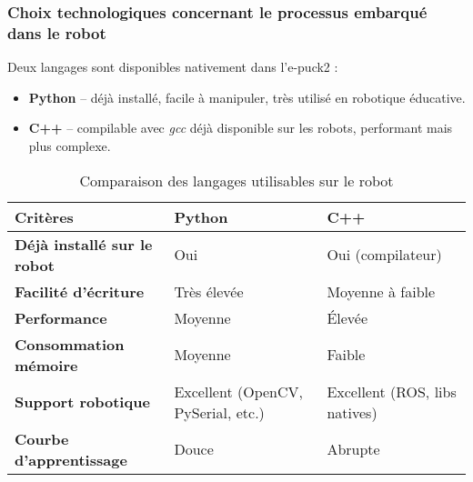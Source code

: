 \subsubsection{Choix technologiques concernant le processus embarqué dans le robot} \label{sec:choix_robot}
Deux langages sont disponibles nativement dans l'e-puck2 :
\begin{itemize}
    \item \textbf{Python} – déjà installé, facile à manipuler, très utilisé en robotique éducative.
    \item \textbf{C++} – compilable avec \textit{gcc} déjà disponible sur les robots, performant mais plus complexe.
\end{itemize}

\begin{longtable}[h!]{|p{}|p{}|p{}|}
\caption{\label{tab:comparison_robot_languages} Comparaison des langages utilisables sur le robot} \\

\hline
\textbf{Critères} & \textbf{Python} & \textbf{C++} \\
\endfirsthead

\hline
\textbf{Déjà installé sur le robot} & Oui & Oui (compilateur) \\
\hline
\textbf{Facilité d’écriture} & Très élevée & Moyenne à faible \\
\hline
\textbf{Performance} & Moyenne & Élevée \\
\hline
\textbf{Consommation mémoire} & Moyenne & Faible \\
\hline
\textbf{Support robotique} & Excellent (OpenCV, PySerial, etc.) & Excellent (ROS, libs natives) \\
\hline
\textbf{Courbe d’apprentissage} & Douce & Abrupte \\
\hline
\end{longtable}
